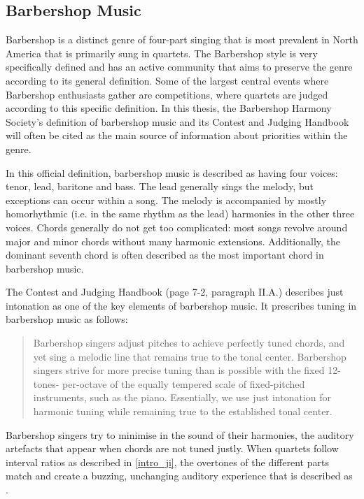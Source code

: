 \documentclass[a4paper]{article}
\begin{document}
\subsection{Barbershop Music}
\label{intro_bs}
Barbershop is a distinct genre of four-part singing that is most prevalent in North America that is primarily sung in quartets. \cite{garnett_ethics_1999} The Barbershop style is very specifically defined and has an active community that aims to preserve the genre according to its general definition. Some of the largest central events where Barbershop enthusiasts gather are competitions, where quartets are judged according to this specific definition. In this thesis, the Barbershop Harmony Society's definition of barbershop music and its Contest and Judging Handbook \cite{barbershop_harmony_society_contest_2022} will often be cited as the main source of information about priorities within the genre.

In this official definition, barbershop music is described as having four voices: tenor, lead, baritone and bass. The lead generally sings the melody, but exceptions can occur within a song. The melody is accompanied by mostly homorhythmic (i.e. in the same rhythm as the lead) harmonies in the other three voices. Chords generally do not get too complicated: most songs revolve around major and minor chords without many harmonic extensions. \cite{barbershop_harmony_society_contest_2022} Additionally, the dominant seventh chord is often described as the most important chord in barbershop music. \cite{averill_bell_1999}

The Contest and Judging Handbook (page 7-2, paragraph II.A.) describes just intonation as one of the key elements of barbershop music. It prescribes tuning in barbershop music as follows:
\begin{quote}
	Barbershop singers adjust pitches to achieve perfectly tuned chords, and yet sing a melodic line that remains true to the tonal center. Barbershop singers strive for more precise tuning than is possible with the fixed 12-tones- per-octave of the equally tempered scale of fixed-pitched instruments, such as the piano. Essentially, we use just intonation for harmonic tuning while remaining true to the established tonal center. \cite{barbershop_harmony_society_contest_2022}
\end{quote}
Barbershop singers try to minimise  in the sound of their harmonies, the auditory artefacts that appear when chords are not tuned justly. When quartets follow interval ratios as described in \ref{intro_ji}, the overtones of the different parts match and create a buzzing, unchanging auditory experience that is described as .
\end{document}
